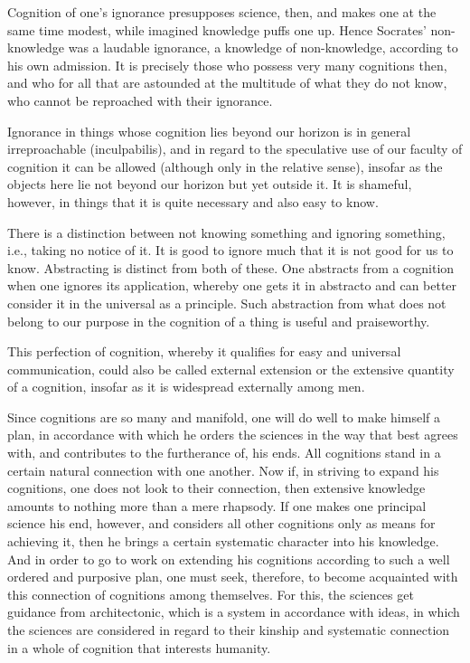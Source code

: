     Cognition of one's ignorance presupposes science, then,
    and makes one at the same time modest,
    while imagined knowledge puffs one up.
    Hence Socrates' non-knowledge was a laudable ignorance,
    a knowledge of non-knowledge, according to his own admission.
    It is precisely those who possess very many cognitions then,
    and who for all that are astounded at
    the multitude of what they do not know,
    who cannot be reproached with their ignorance.

    Ignorance in things whose cognition lies beyond
    our horizon is in general irreproachable (inculpabilis),
    and in regard to the speculative use of our faculty of cognition
    it can be allowed (although only in the relative sense),
    insofar as the objects here lie
    not beyond our horizon but yet outside it.
    It is shameful, however, in things that
    it is quite necessary and also easy to know.

    There is a distinction between
    not knowing something
    and ignoring something,
    i.e., taking no notice of it.
    It is good to ignore much that
    it is not good for us to know.
    Abstracting is distinct from both of these.
    One abstracts from a cognition
    when one ignores its application,
    whereby one gets it in abstracto
    and can better consider it in
    the universal as a principle.
    Such abstraction from what does not belong
    to our purpose in the cognition of a thing
    is useful and praiseworthy.

    This perfection of cognition,
    whereby it qualifies for
    easy and universal communication,
    could also be called external extension
    or the extensive quantity of a cognition,
    insofar as it is widespread externally among men.

    Since cognitions are so many and manifold,
    one will do well to make himself a plan,
    in accordance with which he orders the sciences
    in the way that best agrees with,
    and contributes to the furtherance of, his ends.
    All cognitions stand in a certain
    natural connection with one another.
    Now if, in striving to expand his cognitions,
    one does not look to their connection,
    then extensive knowledge amounts to
    nothing more than a mere rhapsody.
    If one makes one principal science his end, however,
    and considers all other cognitions only
    as means for achieving it,
    then he brings a certain systematic character into his knowledge.
    And in order to go to work on extending his cognitions
    according to such a well ordered and purposive plan,
    one must seek, therefore, to become acquainted with
    this connection of cognitions among themselves.
    For this, the sciences get guidance from architectonic,
    which is a system in accordance with ideas,
    in which the sciences are considered
    in regard to their kinship
    and systematic connection in
    a whole of cognition that interests humanity.

